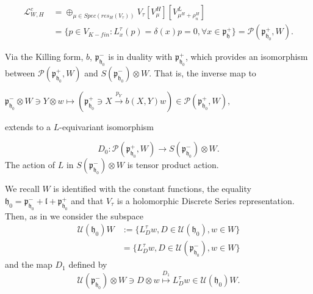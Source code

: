 \documentclass[12pt]{amsart}
\theoremstyle{definition}
\theoremstyle{remark}
\numberwithin{equation}{section}
\begin{document}
 \begin{equation}\label{eq:Lwh} \begin{split} \mathcal L_{W,H}^c   \ &  =\oplus_{\mu \in Spec(res_H(V_\tau))} V_\tau[V_\mu^H][V_{\mu^H +\rho_n^H}^L] \\ & =\{p \in V_{K-fin}: L_x^\tau(p)=\delta(x)p=0, \forall x \in \mathfrak p_{\mathfrak h}^+ \}=\mathcal P(\mathfrak p_{\mathfrak h_0}^+,W). \end{split} \end{equation}





 Via the Killing form, $b$, $\mathfrak p_{\mathfrak h_0}^-$ is in duality with $\mathfrak p_{\mathfrak h_0}^+$, which provides an isomorphism between $\mathcal P(\mathfrak p_{\mathfrak h_0}^+,W)$ and $S(\mathfrak p_{\mathfrak h_0}^-)\otimes W$. That is, the inverse  map to

 \phantom{xx} $\mathfrak p_{\mathfrak h_0}^- \otimes W  \ni Y\otimes w \mapsto (\mathfrak p_{\mathfrak h_0}^+ \ni X \stackrel{p_Y}{\longrightarrow} b(X,Y)w)\in \mathcal P(\mathfrak p_{\mathfrak h_0}^+,W),$


  extends to a   $L$-equivariant isomorphism

 \begin{equation*} D_0 :    \mathcal P(\mathfrak p_{\mathfrak h_0}^+,W) \rightarrow S(\mathfrak p_{\mathfrak h_0}^-)\otimes W .\end{equation*} The action of $L$ in $S(\mathfrak p_{\mathfrak h_0}^-)\otimes W$ is   tensor product   action.




 We recall $W$ is identified with the constant functions, the equality $\mathfrak h_0=\mathfrak p_{\mathfrak h_0}^- +\mathfrak l + \mathfrak p_{\mathfrak h_0}^+$ and that $V_\tau$ is a holomorphic Discrete Series  representation. Then, as in \cite{Va}\cite{OV3} we consider the subspace  \begin{equation*} \begin{split} \mathcal U(\mathfrak h_0)W  & :=\{L_D^\tau  w, D\in \mathcal U(\mathfrak h_0), w\in W\} \\ & =\{L_D^\tau  w, D\in \mathcal U(\mathfrak p_{\mathfrak h_0}^-), w\in W\}\end{split} \end{equation*} and  the map $D_1$ defined by
 $$\mathcal U(\mathfrak p_{\mathfrak h_0}^-)\otimes W \ni D\otimes w \stackrel{D_1}{\longmapsto} L_D^\tau  w \in \mathcal U(\mathfrak h_0)W.$$
\end{document}
